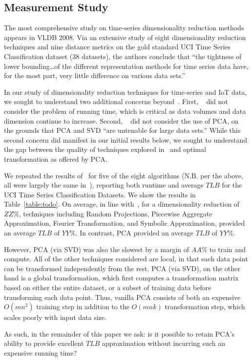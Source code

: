 \subsection{Measurement Study}

The most comprehensive study on time-series dimensionality reduction methods appears in VLDB 2008. Via an extensive study of eight dimensionality reduction techniques and nine distance metrics on the gold standard UCI Time Series Classification dataset (38 datasets), the authors conclude that ``the tightness of lower bounding\dots of the different representation methods for time series data have, for the most part, very little difference on various data sets.''

In our study of dimensionality reduction techniques for time-series and IoT data, we sought to understand two additional concerns beyond~\cite{whateverthatpaper}.
First, ~\cite{thatpaper} did not consider the problem of running time, which is critical as data volumes and data dimension continue to increase.
Second, ~\cite{thatpaper} did not consider the use of PCA, on the grounds that PCA and SVD ``are untenable for large data sets.''
While this second concern did manifest in our initial results below, we sought to understand the gap between the quality of techniques explored in~\cite{thatpaper} and optimal transformation as offered by PCA.

We repeated the results of~\cite{thatpaper} for five of the eight algorithms (N.B. per the above, all were largely the same in~\cite{thatpaper}), reporting both runtime and average $TLB$ for the UCI Time Series Classification Datasets. We show the results in Table~\ref{table:todo}. On average, in line with~\cite{thatpaper}, for a dimensionality reduction of $ZZ\%$, techniques including Random Projections, Piecewise Aggregate Approximation, Fourier Transformation, and Symbolic Approximation, provided an average $TLB$ of $YY\%$. In contrast, PCA provided an average $TLB$ of $YY\%$.

However, PCA (via SVD) was also the slowest by a margin of $AA\%$ to train and compute.  All of the other techniques considered are local, in that each data point can be transformed independently from the rest. PCA (via SVD), on the other hand is a global transformation, which first computes a transformation matrix based on either the entire dataset, or a subset of training data before transforming each data point. Thus, vanilla PCA consists of both an expensive $O(mn^2)$ training step in addition to the $O(mnk)$ transformation step, which scales poorly with input data size. 

As such, in the remainder of this paper we ask: is it possible to retain PCA's ability to provide excellent $TLB$ approximation without incurring such an expensive running time?